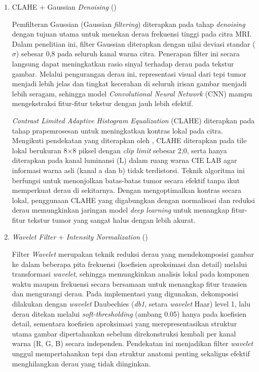 \begin{enumerate}
	\item CLAHE + Gaussian \textit{Denoising} (\textcite{putra2025enhanced})
	
	Pemfilteran Gaussian (Gaussian \textit{filtering}) diterapkan pada tahap \textit{denoising} dengan tujuan utama untuk menekan derau frekuensi tinggi pada citra MRI. Dalam penelitian ini, filter Gaussian diterapkan dengan nilai deviasi standar ($\sigma$) sebesar 0,8 pada seluruh kanal warna citra. Penerapan filter ini secara langsung dapat meningkatkan rasio sinyal terhadap derau pada tekstur gambar. Melalui pengurangan derau ini, representasi visual dari tepi tumor menjadi lebih jelas dan tingkat kecerahan di seluruh irisan gambar menjadi lebih seragam, sehingga model \textit{Convolutional Neural Network} (CNN) mampu mengekstraksi fitur-fitur tekstur dengan jauh lebih efektif.
	
	\textit{Contrast Limited Adaptive Histogram Equalization} (CLAHE) diterapkan pada tahap prapemrosesan untuk meningkatkan kontras lokal pada citra. Mengikuti pendekatan yang diterapkan oleh \textcite{emmanuel2026interpretable}, CLAHE diterapkan pada tile lokal berukuran 8$\times$8 piksel dengan \textit{clip limit} sebesar 2,0, serta hanya diterapkan pada kanal luminansi (L) dalam ruang warna CIE LAB agar informasi warna asli (kanal a dan b) tidak terdistorsi. Teknik algoritma ini berfungsi untuk menonjolkan batas-batas tumor secara efektif tanpa ikut memperkuat derau di sekitarnya. Dengan mengoptimalkan kontras secara lokal, penggunaan CLAHE yang digabungkan dengan normalisasi dan reduksi derau memungkinkan jaringan model \textit{deep learning} untuk menangkap fitur-fitur tekstur tumor yang sangat halus dengan lebih akurat.
	
	\item \textit{Wavelet Filter} + \textit{Intensity Normalization} (\textcite{flower2025performance})
	
	Filter \textit{Wavelet} merupakan teknik reduksi derau yang mendekomposisi gambar ke dalam beberapa pita frekuensi (koefisien aproksimasi dan detail) melalui transformasi \textit{wavelet}, sehingga memungkinkan analisis lokal pada komponen waktu maupun frekuensi secara bersamaan untuk menangkap fitur transien dan mengurangi derau. Pada implementasi yang digunakan, dekomposisi dilakukan dengan \textit{wavelet} Daubechies (\textit{db1}, setara \textit{wavelet} Haar) level 1, lalu derau ditekan melalui \textit{soft-thresholding} (ambang 0.05) hanya pada koefisien detail, sementara koefisien aproksimasi yang merepresentasikan struktur utama gambar dipertahankan sebelum direkonstruksi kembali per kanal warna (R, G, B) secara independen. Pendekatan ini menjadikan filter \textit{wavelet} unggul mempertahankan tepi dan struktur anatomi penting sekaligus efektif menghilangkan derau yang tidak diinginkan.
	

\end{enumerate}
